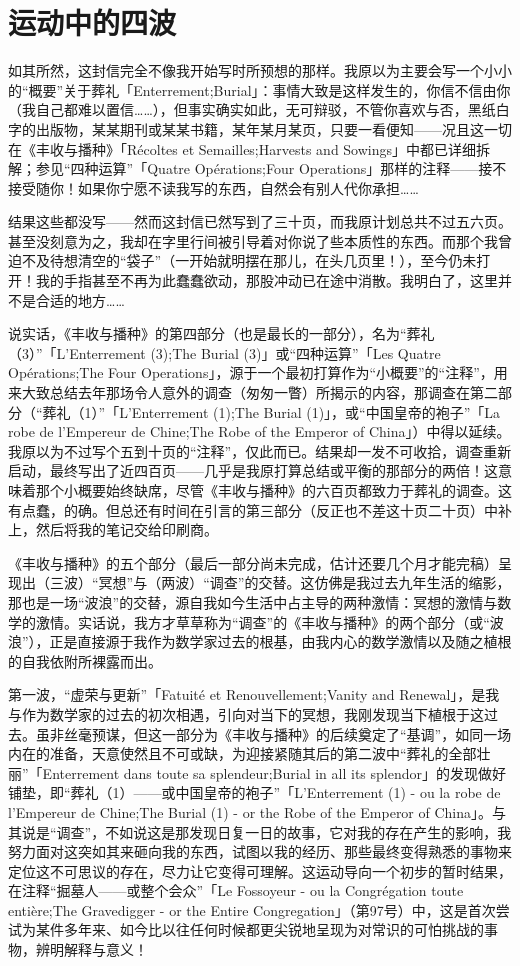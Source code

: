 \section{运动中的四波}

如其所然，这封信完全不像我开始写时所预想的那样。我原以为主要会写一个小小的“概要”关于葬礼「Enterrement;Burial」：事情大致是这样发生的，你信不信由你（我自己都难以置信……），但事实确实如此，无可辩驳，不管你喜欢与否，黑纸白字的出版物，某某期刊或某某书籍，某年某月某页，只要一看便知——况且这一切在《丰收与播种》「Récoltes et Semailles;Harvests and Sowings」中都已详细拆解；参见“四种运算”「Quatre Opérations;Four Operations」那样的注释——接不接受随你！如果你宁愿不读我写的东西，自然会有别人代你承担……

结果这些都没写——然而这封信已然写到了三十页，而我原计划总共不过五六页。甚至没刻意为之，我却在字里行间被引导着对你说了些本质性的东西。而那个我曾迫不及待想清空的“袋子”（一开始就明摆在那儿，在头几页里！），至今仍未打开！我的手指甚至不再为此蠢蠢欲动，那股冲动已在途中消散。我明白了，这里并不是合适的地方……

说实话，《丰收与播种》的第四部分（也是最长的一部分），名为“葬礼（3）”「L'Enterrement (3);The Burial (3)」或“四种运算”「Les Quatre Opérations;The Four Operations」，源于一个最初打算作为“小概要”的“注释”，用来大致总结去年那场令人意外的调查（匆匆一瞥）所揭示的内容，那调查在第二部分（“葬礼（1）”「L'Enterrement (1);The Burial (1)」，或“中国皇帝的袍子”「La robe de l'Empereur de Chine;The Robe of the Emperor of China」）中得以延续。我原以为不过写个五到十页的“注释”，仅此而已。结果却一发不可收拾，调查重新启动，最终写出了近四百页——几乎是我原打算总结或平衡的那部分的两倍！这意味着那个小概要始终缺席，尽管《丰收与播种》的六百页都致力于葬礼的调查。这有点蠢，的确。但总还有时间在引言的第三部分（反正也不差这十页二十页）中补上，然后将我的笔记交给印刷商。

《丰收与播种》的五个部分（最后一部分尚未完成，估计还要几个月才能完稿）呈现出（三波）“冥想”与（两波）“调查”的交替。这仿佛是我过去九年生活的缩影，那也是一场“波浪”的交替，源自我如今生活中占主导的两种激情：冥想的激情与数学的激情。实话说，我方才草草称为“调查”的《丰收与播种》的两个部分（或“波浪”），正是直接源于我作为数学家过去的根基，由我内心的数学激情以及随之植根的自我依附所裸露而出。

第一波，“虚荣与更新”「Fatuité et Renouvellement;Vanity and Renewal」，是我与作为数学家的过去的初次相遇，引向对当下的冥想，我刚发现当下植根于这过去。虽非丝毫预谋，但这一部分为《丰收与播种》的后续奠定了“基调”，如同一场内在的准备，天意使然且不可或缺，为迎接紧随其后的第二波中“葬礼的全部壮丽”「Enterrement dans toute sa splendeur;Burial in all its splendor」的发现做好铺垫，即“葬礼（1）——或中国皇帝的袍子”「L'Enterrement (1) - ou la robe de l'Empereur de Chine;The Burial (1) - or the Robe of the Emperor of China」。与其说是“调查”，不如说这是那发现日复一日的故事，它对我的存在产生的影响，我努力面对这突如其来砸向我的东西，试图以我的经历、那些最终变得熟悉的事物来定位这不可思议的存在，尽力让它变得可理解。这运动导向一个初步的暂时结果，在注释“掘墓人——或整个会众”「Le Fossoyeur - ou la Congrégation toute entière;The Gravedigger - or the Entire Congregation」（第97号）中，这是首次尝试为某件多年来、如今比以往任何时候都更尖锐地呈现为对常识的可怕挑战的事物，辨明解释与意义！

